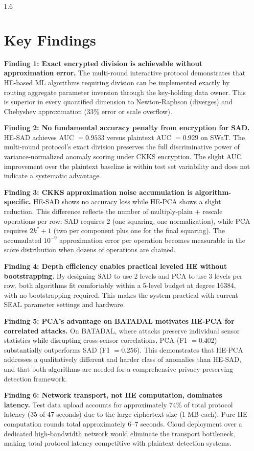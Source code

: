 \begin{spacing}{1.6}
\section{Key Findings}

\textbf{Finding 1: Exact encrypted division is achievable without approximation
error.}
The multi-round interactive protocol demonstrates that HE-based ML algorithms
requiring division can be implemented exactly by routing aggregate parameter
inversion through the key-holding data owner. This is superior in every
quantified dimension to Newton-Raphson (diverges) and Chebyshev approximation
(33\% error or scale overflow).

\textbf{Finding 2: No fundamental accuracy penalty from encryption for SAD.}
HE-SAD achieves AUC $= 0.9533$ versus plaintext AUC $= 0.929$ on SWaT. The
multi-round protocol's exact division preserves the full discriminative power
of variance-normalized anomaly scoring under CKKS encryption. The slight AUC
improvement over the plaintext baseline is within test set variability and
does not indicate a systematic advantage.

\textbf{Finding 3: CKKS approximation noise accumulation is algorithm-specific.}
HE-SAD shows no accuracy loss while HE-PCA shows a slight reduction. This
difference reflects the number of multiply-plain + rescale operations per row:
SAD requires 2 (one squaring, one normalization), while PCA requires $2k^* + 1$
(two per component plus one for the final squaring). The accumulated $10^{-9}$
approximation error per operation becomes measurable in the score distribution
when dozens of operations are chained.

\textbf{Finding 4: Depth efficiency enables practical leveled HE without
bootstrapping.}
By designing SAD to use 2 levels and PCA to use 3 levels per row, both
algorithms fit comfortably within a 5-level budget at degree 16384, with no
bootstrapping required. This makes the system practical with current SEAL
parameter settings and hardware.

\textbf{Finding 5: PCA's advantage on BATADAL motivates HE-PCA for correlated
attacks.}
On BATADAL, where attacks preserve individual sensor statistics while disrupting
cross-sensor correlations, PCA (F1 $= 0.402$) substantially outperforms SAD
(F1 $= 0.256$). This demonstrates that HE-PCA addresses a qualitatively
different and harder class of anomalies than HE-SAD, and that both algorithms
are needed for a comprehensive privacy-preserving detection framework.

\textbf{Finding 6: Network transport, not HE computation, dominates latency.}
Test data upload accounts for approximately 74\% of total protocol latency
(35 of 47 seconds) due to the large ciphertext size (1 MB each). Pure HE
computation rounds total approximately 6--7 seconds. Cloud deployment over a
dedicated high-bandwidth network would eliminate the transport bottleneck,
making total protocol latency competitive with plaintext detection systems.


\end{spacing}
